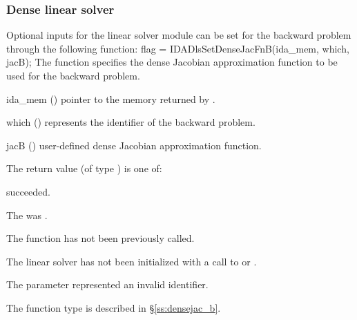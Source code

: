 
\subsubsection{Dense linear solver}
Optional inputs for the {\idadense} linear solver module can be set for the backward
problem through the following function:
{
  flag = IDADlsSetDenseJacFnB(ida\_mem, which, jacB);
}
{
  The function  specifies the dense Jacobian
  approximation function to be used for the backward problem.
}
{
  \begin{args}
  \item[ida\_mem] ()
    pointer to the {\idas} memory returned by .
  \item[which] ()
    represents the identifier of the backward problem.
  \item[jacB] ()
    user-defined dense Jacobian approximation function.
  \end{args}
}
{
  The return value  (of type ) is one of:
  \begin{args}
  \item[\Id{IDADLS\_SUCCESS}] 
     succeeded.
  \item[\Id{IDADLS\_MEM\_NULL}]
    The  was .
  \item[\Id{IDADLS\_NO\_ADJ}]
    The function  has not been previously called.
  \item[\Id{IDADLS\_LMEM\_NULL}]
    The linear solver has not been initialized with a call to 
    or .
  \item[\Id{IDADLS\_ILL\_INPUT}]
    The parameter  represented an invalid identifier.
  \end{args}
}
{
  The function type  is described in \S\ref{ss:densejac_b}.
}


